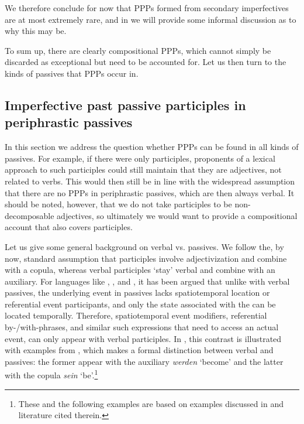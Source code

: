 \documentclass[output=paper,modfonts,newtxmath,hidelinks
\ChapterDOI{10.5281/zenodo.2545513}
]{langscibook}
\begin{document}
\noindent We therefore conclude for now that PPPs formed from secondary imperfectives are at most extremely rare, and in  we will provide some informal discussion as to why this may be. 

To sum up, there are clearly compositional  PPPs, which cannot simply be discarded as exceptional but need to be accounted for. Let us then turn to the kinds of passives that  PPPs occur in.

\subsection{Imperfective past passive participles in periphrastic passives} 
\label{passive}

In this section we address the question whether  PPPs can be found in all kinds of passives. For example, if there were only  participles, proponents of a lexical approach to such participles could still maintain that they are adjectives, not related to  verbs. This would then still be in line with the widespread assumption that there are no  PPPs in periphrastic passives, which are then always verbal. It should be noted, however, that we do not take  participles to be non-decomposable adjectives, so ultimately we would want to provide a compositional account that also covers  participles.

Let us give some general background on verbal vs.  passives. We follow the, by now, standard assumption that  participles involve adjectivization and combine with a copula, whereas verbal participles `stay' verbal and combine with an auxiliary. For languages like , , and , it has been argued \citep[see][and literature cited therein]{gehrkesub15, gehrkenllt, gehrkemarcolingua, alexiadou+lingua} that unlike with verbal passives, the underlying event in  passives lacks spatiotemporal location or referential event participants, and only the state associated with the   can be located temporally. Therefore, spatiotemporal event modifiers, referential by-/with-phrases, and similar such expressions that need to access an actual event, can only appear with verbal participles. In , this contrast is illustrated with examples from , which makes a formal distinction between verbal and  passives: the former appear with the auxiliary \textit{werden} `become' and the latter with the copula \textit{sein} `be'.\footnote{These and the following  examples are based on examples discussed in \citet{gehrkenllt} and literature cited therein.}
\end{document}
